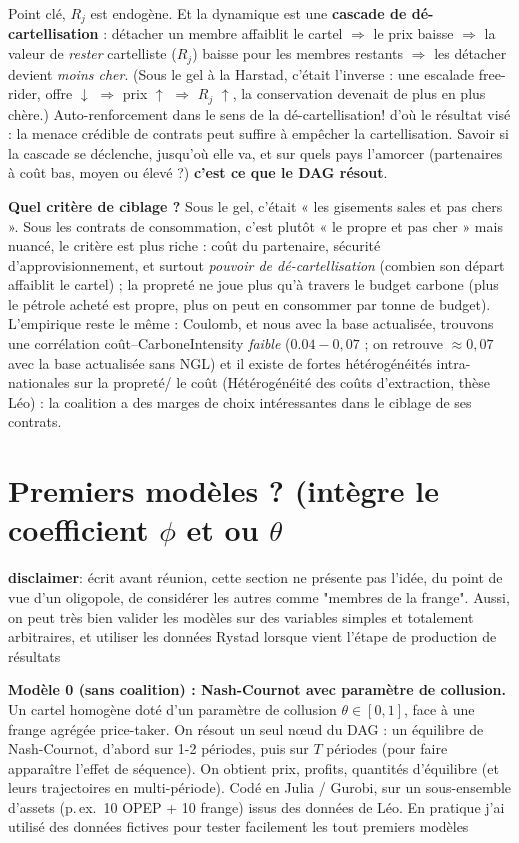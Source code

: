 \documentclass[11pt]{article}
\begin{document}
Point clé, $R_j$ est endogène. Et la dynamique est une \textbf{cascade de dé-cartellisation}  : détacher un membre affaiblit le cartel $\Rightarrow$ le prix baisse $\Rightarrow$ la valeur de \emph{rester} cartelliste ($R_j$) baisse pour les membres restants $\Rightarrow$ les détacher devient \emph{moins cher}. (Sous le gel à la Harstad, c'était l'inverse : une escalade free-rider, offre $\downarrow$ $\Rightarrow$ prix $\uparrow$ $\Rightarrow$ $R_j$ $\uparrow$, la conservation devenait de plus en plus chère.) Auto-renforcement dans le sens de la dé-cartellisation! d'où le résultat visé : la menace crédible de contrats peut suffire à empêcher la cartellisation. Savoir si la cascade se déclenche, jusqu'où elle va, et sur quels pays l'amorcer (partenaires à co\^ut bas, moyen ou élevé ?) \textbf{c'est ce que le DAG résout}.

\textbf{Quel critère de ciblage ?} Sous le gel, c'était « les gisements sales et pas chers ». Sous les contrats de consommation, c'est plutôt « le propre et pas cher » mais nuancé, le critère est plus riche : co\^ut du partenaire, sécurité d'approvisionnement, et surtout \emph{pouvoir de dé-cartellisation} (combien son départ affaiblit le cartel) ; la propreté ne joue plus qu'à travers le budget carbone (plus le pétrole acheté est propre, plus on peut en consommer par tonne de budget). L'empirique reste le m\^eme : Coulomb, et nous avec la base actualisée, trouvons une corrélation co\^ut--CarboneIntensity \emph{faible} ($0.04-0{,}07$ ; on retrouve $\approx 0{,}07$ avec la base actualisée sans NGL) et il existe de fortes hétérogénéités intra-nationales sur la propreté/ le co\^ut (Hétérogénéité des coûts d’extraction, thèse Léo) : la coalition a des marges de choix intéressantes dans le ciblage de ses contrats.




\section{Premiers modèles ? (intègre le coefficient $\phi$ et ou $\theta$}

\textbf{disclaimer}: écrit avant réunion, cette section ne présente pas l'idée, du point de vue d'un oligopole, de considérer les autres comme "membres de la frange". 
Aussi, on peut très bien valider les modèles sur des variables simples et totalement arbitraires, et utiliser les données Rystad lorsque vient l'étape de production de résultats


\textbf{Modèle 0 (sans coalition) : Nash-Cournot avec paramètre de collusion.} Un cartel homogène
doté d'un paramètre de collusion $\theta\in[0,1]$, face à une frange agrégée price-taker. On résout
un seul n\oe ud du DAG : un équilibre de Nash-Cournot, d'abord sur 1-2 périodes, puis sur $T$
périodes (pour faire appara\^itre l'effet de séquence). On obtient prix, profits, quantités d'équilibre
(et leurs trajectoires en multi-période). Codé en Julia / Gurobi, sur un sous-ensemble d'assets
(p.\,ex.\ 10 OPEP + 10 frange) issus des données de Léo. En pratique j'ai utilisé des données fictives pour tester facilement les tout premiers modèles
\end{document}
